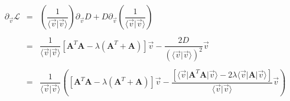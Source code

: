 \documentclass[aps,12pt]{revtex4}
\begin{document}
\begin{equation}
\begin{array}{rcl}
\partial_{\vec{v}} \mathcal{L} & = & \left( 
	\dfrac{1}{\langle \vec{v} \vert \vec{v} \rangle } 
	\right) \partial_{\vec{v}} D + D \partial_{\vec{v}} \left( 
	\dfrac{1}{\langle \vec{v} \vert \vec{v} \rangle } 
	\right)\\
	\\
	& = & 
	\dfrac{1}{\langle \vec{v} \vert \vec{v} \rangle } 
	 \left\lbrack \bm{A}^T \bm{A} - \lambda \left( \bm{A}^T + \bm{A}\right) \right\rbrack \vec{v}
	  -\dfrac{2D}{ \left(\langle \vec{v} \vert \vec{v} \rangle\right)^2 } \vec{v} \\
	  \\
	  & = & 
	  \dfrac{1}{\langle \vec{v} \vert \vec{v} \rangle } 
	  \left(
	  \left\lbrack \bm{A}^T \bm{A} - \lambda \left( \bm{A}^T + \bm{A}\right) \right\rbrack \vec{v}
	  - 
	  \dfrac{
	  \left[ 
	  \langle \vec{v} \vert \bm{A}^T \bm{A} \vert \vec{v} \rangle - 
	  2 \lambda \langle \vec{v} \vert \bm{A} \vert \vec{v} \rangle
	  \right]
	  }{\langle \vec{v} \vert \vec{v} \rangle}
	  \vec{v}
	  \right)\\
\end{array}
\end{equation}
\end{document}
